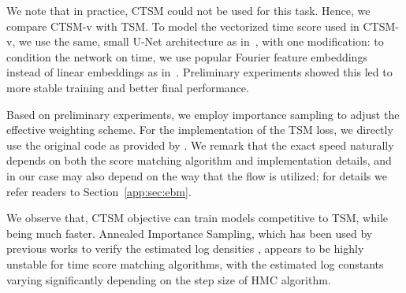 We note that in practice, CTSM could not be used for this task.
Hence, we compare CTSM-v with TSM. To model the vectorized time score used in CTSM-v,  we use the same, small U-Net architecture as in~\citet{choi2022densityratio}, with one modification: to condition the network on time, we use popular Fourier feature embeddings~\citep{tancik2020randomfourier,song2021sde} instead of linear embeddings as in~\citet{choi2022densityratio}. Preliminary experiments showed this led to more stable training and better final performance. 

Based on preliminary experiments, we employ importance sampling to adjust the effective weighting scheme. For the implementation of the TSM loss, we directly use the original code as provided by \citet{choi2022densityratio}. We remark that the exact speed naturally depends on both the score matching algorithm and implementation details, and in our case may also depend on the way that the flow is utilized; for details we refer readers to Section~\ref{app:sec:ebm}.

We observe that, CTSM objective can train models competitive to TSM, while being much faster. Annealed Importance Sampling, which has been used by previous works to verify the estimated log densities \citep{Rhodes2020,choi2022densityratio}, appears to be highly unstable for time score matching algorithms, with the estimated log constants varying significantly depending on the step size of HMC algorithm.














